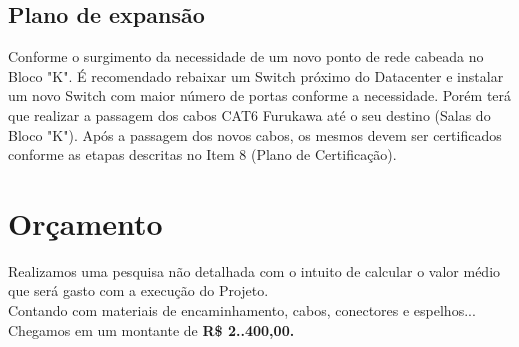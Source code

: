 \documentclass[	DIV=calc,%
paper=a4,%
fontsize=12pt,%
onecolumn]{scrartcl}	 					%
\begin{document}
	
	\subsection{Plano de expansão}
	
	Conforme o surgimento da necessidade de um novo ponto de rede cabeada no Bloco "K". É recomendado  rebaixar um Switch próximo do Datacenter e instalar um novo Switch com maior número de portas conforme a necessidade. Porém terá que realizar a passagem dos cabos CAT6 Furukawa até o seu destino (Salas do Bloco "K"). Após a passagem dos novos cabos, os mesmos devem ser certificados conforme as etapas descritas no Item 8 (Plano de Certificação).
	
	\section{Orçamento}
	Realizamos uma pesquisa não detalhada com o intuito de calcular o valor médio que será gasto com a execução do Projeto.
	\\
	Contando com materiais de encaminhamento, cabos, conectores e espelhos...
	\\
	Chegamos em um montante de \textbf{R\$ 2..400,00.} 
	
\end{document}
